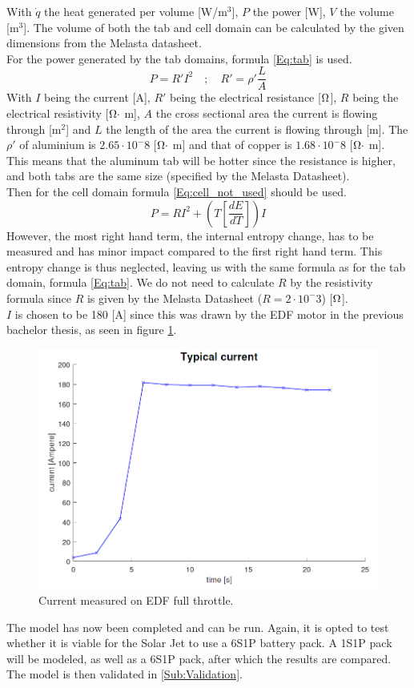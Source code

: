 \begin{enumerate}
With $\dot{q}$ the heat generated per volume [W/m$^3$], $P$ the power [W], $V$ the volume [m$^3$]. The volume of both the tab and cell domain can be calculated by the given dimensions from the Melasta datasheet.\\
For the power generated by the tab domains, formula \ref{Eq:tab} is used.
\begin{equation}
\label{Eq:tab}
P=R'I^2 \quad ;\quad R'=\rho'\frac{L}{A}
\end{equation}
With $I$ being the current [A], $R'$ being the electrical resistance [$\ohm$], $R$ being the electrical resistivity [$\ohm \cdot$ m], $A$ the cross sectional area the current is flowing through [m$^2$] and $L$ the length of the area the current is flowing through [m]. The $\rho'$ of aluminium is $2.65\cdot 10^-8$ [$\ohm\cdot$ m] and that of copper is $1.68\cdot 10^-8$ [$\ohm\cdot$ m]. This means that the aluminum tab will be hotter since the resistance is higher, and both tabs are the same size (specified by the Melasta Datasheet). \\
Then for the cell domain formula \ref{Eq:cell_not_used} should be used.
\begin{equation}
\label{Eq:cell_not_used}
P=RI^2+(T[\frac{dE}{dT}])I
\end{equation}
However, the most right hand term, the internal entropy change, has to be measured and has minor impact compared to the first right hand term. This entropy change is thus neglected, leaving us with the same formula as for the tab domain, formula \ref{Eq:tab}. We do not need to calculate $R$ by the resistivity formula since $R$ is given by the Melasta Datasheet ($R = 2\cdot 10^-3$) [$\ohm$]. \\
$I$ is chosen to be 180 [A] since this was drawn by the EDF motor in the previous bachelor thesis, as seen in figure \ref{Fig:Typical_Current}.
\begin{figure} [H]
	\centering
	\includegraphics[width=0.5\linewidth]{Figures/Typical_Current.PNG}
	\caption{Current measured on EDF full throttle.}
   \label{Fig:Typical_Current}
\end{figure}
\end{enumerate}
The model has now been completed and can be run. Again, it is opted to test whether it is viable for the Solar Jet to use a 6S1P battery pack. A 1S1P pack will be modeled, as well as a 6S1P pack, after which the results are compared.\\ \newline
The model is then validated in \ref{Sub:Validation}.



